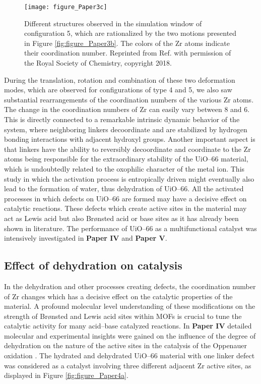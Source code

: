 \begin{figure}[!htp]
	\centering
	\texttt{[image: figure\_Paper3c]}
	\caption[Different structures observed in the simulation window of
	configuration 5, which are rationalized by the two motions presented in Figure
	\ref{fig:figure_Paper3b}. The colors of the Zr atoms indicate their
	coordination number.]{Different structures observed in the simulation window of
	configuration 5, which are rationalized by the two motions presented in Figure
	\ref{fig:figure_Paper3b}. The colors of the Zr atoms indicate their
	coordination number. Reprinted from Ref.\cite{Hajek2018} with permission of the
	Royal Society of Chemistry, copyright 2018.}
	\label{fig:figure_Paper3c}
\end{figure}
\npar
During the translation, rotation and combination of these two
deformation modes, which are observed for configurations of type 4 and 5, we
also saw substantial rearrangements of the coordination numbers of the various Zr
atoms. The change in the coordination numbers of Zr can easily vary between 8
and 6. This is directly connected to a remarkable intrinsic dynamic behavior of
the system, where neighboring linkers decoordinate and are 
stabilized by hydrogen bonding interactions with adjacent hydroxyl groups.
Another important aspect is that linkers have the ability to reversibly
decoordinate and coordinate to the Zr atoms being responsible for the
extraordinary stability of the UiO--66 material, which is undoubtedly related to the oxophilic character of the metal ion. This study in which the activation
process is entropically driven might eventually also lead to the
formation of water, thus dehydration of UiO--66. All the activated processes in
which defects on UiO--66 are formed may have a decisive effect on catalytic
reactions. These defects which create active sites in the material may act as
Lewis acid but also Br\o{}nsted acid or base sites as it has already been shown in literature.
The performance of UiO--66 as a multifunctional catalyst was intensively
investigated in \textbf{Paper IV} and \textbf{Paper V}.


\subsection*{Effect of dehydration on catalysis}
In the dehydration and other processes creating defects, the coordination number
of Zr changes which has a decisive effect on the catalytic properties of the
material. A profound molecular level understanding of these modifications on the
strength of Br\o{}nsted and Lewis acid sites within MOFs is crucial to tune the catalytic
activity for many acid--base catalyzed reactions. In \textbf{Paper IV} detailed
molecular and experimental insights were gained on the influence of the degree
of dehydration on the nature of the active sites in the catalysis of the
Oppenauer oxidation \cite{Hajek2017}.
The hydrated and dehydrated UiO--66 material with one linker defect was
considered as a catalyst involving three different adjacent Zr active sites, as displayed in Figure
\ref{fig:figure_Paper4a}.

